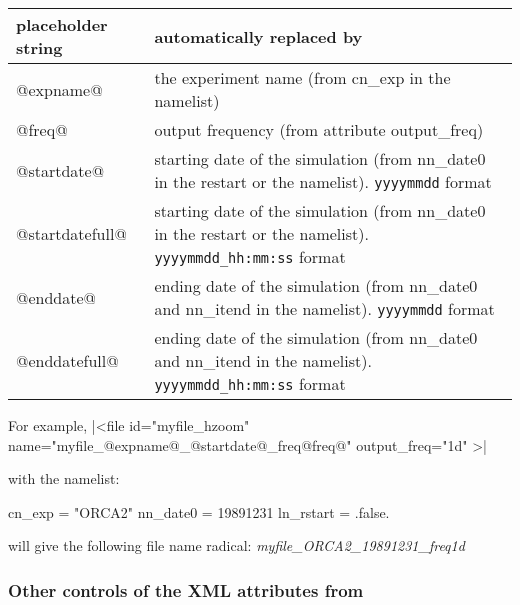 \documentclass[../main/NEMO_manual]{subfiles}
\begin{document}
\begin{table}
  \begin{tabularx}{\textwidth}{|lX|}
    \hline
    \centering placeholder string &
    automatically replaced by                          \\
    \hline
    \hline
    \centering @expname@          &
    the experiment name (from cn\_exp in the namelist) \\
    \hline
    \centering @freq@             &
    output frequency (from attribute output\_freq)     \\
    \hline
    \centering @startdate@        &
    starting date of the simulation (from nn\_date0 in the restart or the namelist).
    \newline
    \verb?yyyymmdd?          format                   \\
    \hline
    \centering @startdatefull@    &
    starting date of the simulation (from nn\_date0 in the restart or the namelist).
    \newline
    \verb?yyyymmdd_hh:mm:ss? format                    \\
    \hline
    \centering @enddate@          &
    ending date of the simulation   (from nn\_date0 and nn\_itend  in the namelist).
    \newline
    \verb?yyyymmdd?          format                    \\
    \hline
    \centering @enddatefull@      &
    ending date of the simulation   (from nn\_date0 and nn\_itend  in the namelist).
    \newline
    \verb?yyyymmdd_hh:mm:ss? format                    \\
    \hline
  \end{tabularx}
\end{table}

\noindent For example,
\xmlline|<file id="myfile_hzoom" name="myfile_@expname@_@startdate@_freq@freq@" output_freq="1d" >|

\noindent with the namelist:
\begin{forlines}
cn_exp    = "ORCA2"
nn_date0  = 19891231
ln_rstart = .false.
\end{forlines}

\noindent will give the following file name radical: \textit{myfile\_ORCA2\_19891231\_freq1d}

\subsubsection{Other controls of the XML attributes from \NEMO}
\end{document}

